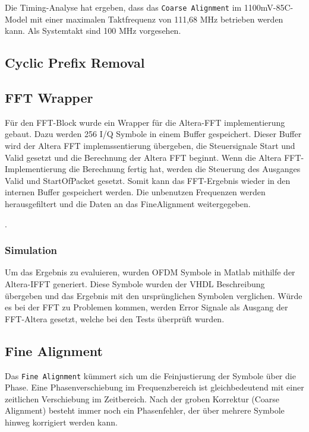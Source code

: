 Die Timing-Analyse hat ergeben, dass das \texttt{Coarse Alignment} im 1100mV-85C-Model mit einer maximalen Taktfrequenz von 111,68 MHz betrieben werden kann. Als Systemtakt sind 100 MHz vorgesehen.

\subsection{Cyclic Prefix Removal}

\subsection{FFT Wrapper}
Für den FFT-Block  wurde ein Wrapper für die Altera-FFT implementierung gebaut. Dazu werden 256 I/Q Symbole in einem Buffer gespeichert. Dieser Buffer wird der Altera FFT implemssentierung übergeben, die Steuersignale Start und Valid gesetzt und die Berechnung der Altera FFT beginnt. Wenn die Altera FFT-Implementierung die Berechnung fertig hat, werden die Steuerung des Ausganges Valid und StartOfPacket gesetzt. Somit kann das FFT-Ergebnis wieder in den internen Buffer gespeichert werden. Die unbenutzen Frequenzen werden herausgefiltert und die Daten an das FineAlignment weitergegeben.

.

\subsubsection{Simulation}
Um das Ergebnis zu evaluieren, wurden OFDM Symbole in Matlab mithilfe der Altera-IFFT generiert. Diese Symbole wurden der VHDL Beschreibung übergeben und das Ergebnis mit den ursprünglichen Symbolen verglichen. Würde es bei der FFT zu Problemen kommen, werden Error Signale als Ausgang der FFT-Altera gesetzt, welche bei den Tests überprüft wurden.

\subsection{Fine Alignment}

Das \texttt{Fine Alignment} kümmert sich um die Feinjustierung der Symbole über die Phase. Eine Phasenverschiebung im Frequenzbereich ist gleichbedeutend mit einer zeitlichen Verschiebung im Zeitbereich. Nach der groben Korrektur (Coarse Alignment) besteht immer noch ein Phasenfehler, der über mehrere Symbole hinweg korrigiert werden kann.\\
\\


